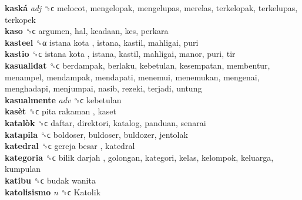 \textbf{kaská} \emph{adj}  ␝ϲ  melocot, mengelopak, mengelupas, merelas, terkelopak, terkelupas, terkopek  \\
\textbf{kaso} ␝ϲ  argumen, hal, keadaan, kes, perkara  \\
\textbf{kasteel} ␝α   istana kota , istana, kastil, mahligai, puri  \\
\textbf{kastio} ␝ϲ   istana kota , istana, kastil, mahligai, manor, puri, tir  \\
\textbf{kasualidat} ␝ϲ  berdampak, berlaku, kebetulan, kesempatan, membentur, menampel, mendampak, mendapati, menemui, menemukan, mengenai, menghadapi, menjumpai, nasib, rezeki, terjadi, untung  \\
\textbf{kasualmente} \emph{adv}  ␝ϲ  kebetulan  \\
\textbf{kasèt} ␝ϲ   pita rakaman , kaset  \\
\textbf{katalòk} ␝ϲ  daftar, direktori, katalog, panduan, senarai  \\
\textbf{katapila} ␝ϲ  boldoser, buldoser, buldozer, jentolak  \\
\textbf{katedral} ␝ϲ   gereja besar , katedral  \\
\textbf{kategoria} ␝ϲ   bilik darjah , golongan, kategori, kelas, kelompok, keluarga, kumpulan  \\
\textbf{katibu} ␝ϲ   budak wanita   \\
\textbf{katolisismo} \emph{n}  ␝ϲ   Katolik   \\
